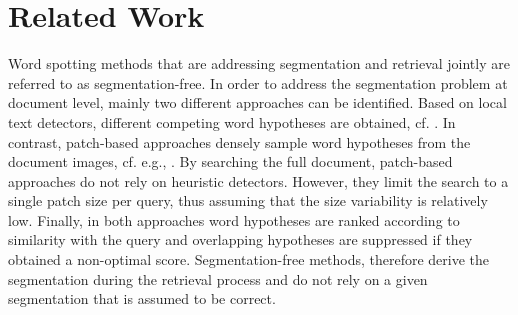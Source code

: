 \section{Related Work}\label{sec:relatedwork}
Word spotting methods that are addressing segmentation and retrieval jointly are referred to as
segmentation-free. 
In order to address the segmentation problem at document level, mainly two different approaches
can be identified. Based on local text detectors, different competing word hypotheses are obtained,
cf. \cite{Leydier09, Rodriguez09, Kovalchuk14, Ghosh15a, Wilkinson17}. 
In contrast, patch-based approaches
densely sample word hypotheses from the document images, cf. e.g., \cite{Gatos09, Almazan14a,
Rothacker15, Rusinol15, Ghosh15}. By searching the full document, patch-based approaches do not 
rely on heuristic detectors. However, they limit the search to a single patch size per
query, thus assuming that the size variability is relatively low. Finally, in both approaches word
hypotheses are ranked according to similarity with the query and overlapping hypotheses are
suppressed if they obtained a non-optimal score. Segmentation-free methods, therefore derive
the segmentation during the retrieval process and do not rely on a given segmentation that is
assumed to be correct.

